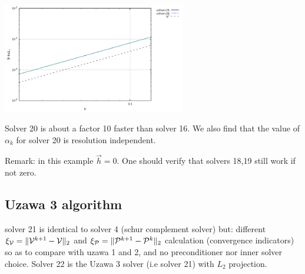\begin{center}
\includegraphics[width=8cm]{python_codes/fieldstone_147/RESULTS/L2/uzawa2/errorsP.pdf}
\end{center}

Solver 20 is about a factor 10 faster than solver 16.
We also find that the value of $\alpha_k$ for solver 20 is resolution independent.

Remark: in this example $\vec{h}=0$. One should verify that solvers 18,19 still work if not zero.

\subsection*{Uzawa 3 algorithm}

solver 21 is identical to solver 4 (schur complement solver) but: 
different $\xi_{\cal V}=\|{\cal V}^{k+1}-{\cal V}\|_2$ and 
$\xi_{\cal P}=\|{\cal P}^{k+1}-{\cal P}^k\|_2$ calculation (convergence indicators) so as to 
compare with uzawa 1 and 2, and no preconditioner nor inner solver choice. 
Solver 22 is the Uzawa 3 solver (i.e solver 21) with $L_2$ projection.

